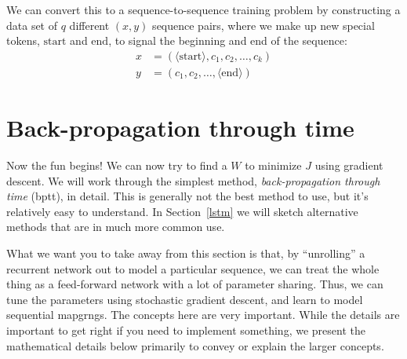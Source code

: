 We can convert this to a sequence-to-sequence training problem by
constructing a data set of $q$ different $(x, y)$ sequence pairs, where we make up
new special tokens, $\text{start}$ and $\text{end}$, to signal the
beginning and end of the sequence:
\begin{align}
x & = (\langle\text{start}\rangle, c_1, c_2, \ldots, c_k)\\
y & = (c_1, c_2, \dots, \langle\text{end}\rangle) 
\end{align}





\section{Back-propagation through time}
\label{sec:bptt}

Now the fun begins!  We can now try to find a $W$ to minimize $J$
using gradient descent.  We will work through the simplest method,
{\em back-propagation through time} ({\sc bptt}), in detail.  This is generally not the best
method to use, but it's relatively easy to understand.  In
Section~\ref{lstm} we will sketch alternative methods that are in much
more common use.

\bigskip 
\begin{noticebox}
  What we want you to take away from this section is that, by
  ``unrolling'' a recurrent network out to model a particular
  sequence, we can treat the whole thing as a feed-forward network
  with a lot of parameter sharing.  Thus, we can tune the parameters
  using stochastic gradient descent, and learn to model sequential
  mapgrngs.  The concepts here are very important.  While the details
  are important to get right if you need to implement something, we
  present the mathematical details below primarily to convey or
  explain the larger concepts.
\end{noticebox}


